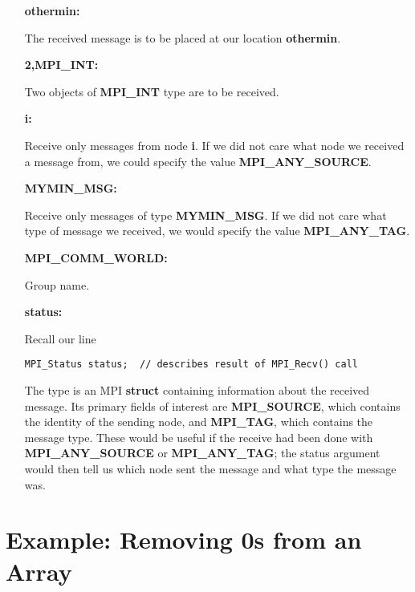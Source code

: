 \begin{itemize}

\item [{\bf othermin:}]

The received message is to be placed at our location {\bf othermin}.

\item [{\bf 2,MPI\_INT:}]

Two objects of {\bf MPI\_INT} type are to be received.

\item [{\bf i:}]

Receive only messages from node {\bf i}.  If we did not care what
node we received a message from, we could specify the value
{\bf MPI\_ANY\_SOURCE}.

\item [{\bf MYMIN\_MSG:}]

Receive only messages of type {\bf MYMIN\_MSG}.  If we did not care what
type of message we received, we would specify the value {\bf
MPI\_ANY\_TAG}.

\item [{\bf MPI\_COMM\_WORLD:}]

Group name.

\item [{\bf status:}]

Recall our line

\begin{Verbatim}[fontsize=\relsize{-2}]
MPI_Status status;  // describes result of MPI_Recv() call 
\end{Verbatim}

The type is an MPI {\bf struct} containing information about the
received message.  Its primary fields of interest are {\bf MPI\_SOURCE},
which contains the identity of the sending node, and {\bf MPI\_TAG},
which contains the message type.  These would be useful if the receive
had been done with {\bf MPI\_ANY\_SOURCE} or {\bf MPI\_ANY\_TAG}; the
status argument would then tell us which node sent the message and what
type the message was.

\end{itemize}

\section{Example:  Removing 0s from an Array}

